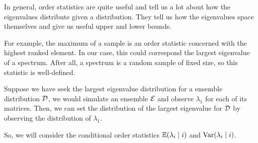 In general, order statistics are quite useful and tell us a lot about how the eigenvalues distribute given a distribution.
They tell us how the eigenvalues space themselves and give us useful upper and lower bounds.

For example, the maximum of a sample is an order statistic concerned with the highest ranked element.
In our case, this could correspond the largest eigenvalue of a spectrum. After all, a spectrum is a random sample of fixed size, so this statistic is well-defined.

\begin{example}
Suppose we have seek the largest eigenvalue distribution for a ensemble distribution $\mathcal{D}$, we would simulate an ensemble $\mathcal{E}$ and observe $\lambda_1$ for each of its matrices.
Then, we can set the distribution of the largest eigenvalue for $\mathcal{D}$ by observing the distribution of $\lambda_1$.
\end{example}


\newpage

So, we will consider the conditional order statistics $\mathbb{E}(\lambda_{i} \mid i)$ and $\text{Var}(\lambda_{i} \mid i)$.



\newpage



\newpage



\newpage

